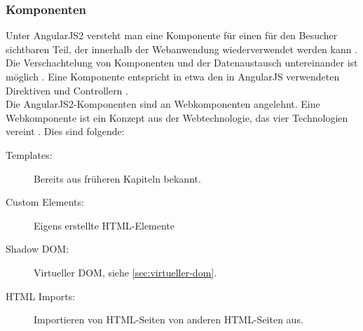 \subsubsection{Komponenten}

Unter AngularJS2 versteht man eine Komponente für einen für den Besucher sichtbaren Teil, der innerhalb der Webanwendung wiederverwendet werden kann \cite[S. 67]{Rangle.io2016}. Die Verschachtelung von Komponenten und der Datenaustausch untereinander ist möglich \cite[S. 71]{Rangle.io2016}. Eine Komponente entspricht in etwa den in AngularJS verwendeten Direktiven und Controllern \cite[S. 16]{Rangle.io2016}.\\
Die AngularJS2-Komponenten sind an Webkomponenten angelehnt. Eine Webkomponente ist ein Konzept aus der Webtechnologie, das vier Technologien vereint \cite[S. 3]{Deeleman2016}. Dies sind folgende:

\begin{description}
	\item[Templates:] Bereits aus früheren Kapiteln bekannt.
	\item[Custom Elements:] Eigens erstellte HTML-Elemente
	\item[Shadow DOM:] Virtueller DOM, siehe \autoref{sec:virtueller-dom}.
	\item[HTML Imports:] Importieren von HTML-Seiten von anderen HTML-Seiten aus.
\end{description}